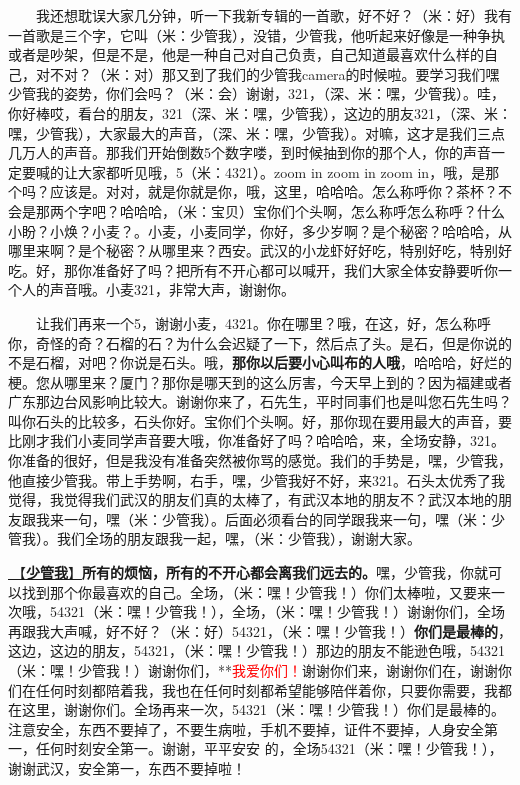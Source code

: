\documentclass[]{ctexbook}
\begin{document}
  我还想耽误大家几分钟，听一下我新专辑的一首歌，好不好？（米：好）我有一首歌是三个字，它叫（米：少管我），没错，少管我，他听起来好像是一种争执或者是吵架，但是不是，他是一种自己对自己负责，自己知道最喜欢什么样的自己，对不对？（米：对）那又到了我们的少管我camera的时候啦。要学习我们嘿少管我的姿势，你们会吗？（米：会）谢谢，321，（深、米：嘿，少管我）。哇，你好棒哎，看台的朋友，321（深、米：嘿，少管我），这边的朋友321，（深、米：嘿，少管我），大家最大的声音，（深、米：嘿，少管我）。对嘛，这才是我们三点几万人的声音。那我们开始倒数5个数字喽，到时候抽到你的那个人，你的声音一定要喊的让大家都听见哦，5（米：4321）。zoom in zoom in zoom in，哦，是那个吗？应该是。对对，就是你就是你，哦，这里，哈哈哈。怎么称呼你？茶杯？不会是那两个字吧？哈哈哈，（米：宝贝）宝你们个头啊，怎么称呼怎么称呼？什么小盼？小焕？小麦？。小麦，小麦同学，你好，多少岁啊？是个秘密？哈哈哈，从哪里来啊？是个秘密？从哪里来？西安。武汉的小龙虾好好吃，特别好吃，特别好吃。好，那你准备好了吗？把所有不开心都可以喊开，我们大家全体安静要听你一个人的声音哦。小麦321，非常大声，谢谢你。

  让我们再来一个5，谢谢小麦，4321。你在哪里？哦，在这，好，怎么称呼你，奇怪的奇？石榴的石？为什么会迟疑了一下，然后点了头。是石，但是你说的不是石榴，对吧？你说是石头。哦，\textbf{那你以后要小心叫布的人哦}，哈哈哈，好烂的梗。您从哪里来？厦门？那你是哪天到的这么厉害，今天早上到的？因为福建或者广东那边台风影响比较大。谢谢你来了，石先生，平时同事们也是叫您石先生吗？叫你石头的比较多，石头你好。宝你们个头啊。好，那你现在要用最大的声音，要比刚才我们小麦同学声音要大哦，你准备好了吗？哈哈哈，来，全场安静，321。你准备的很好，但是我没有准备突然被你骂的感觉。我们的手势是，嘿，少管我，他直接少管我。带上手势啊，右手，嘿，少管我好不好，来321。石头太优秀了我觉得，我觉得我们武汉的朋友们真的太棒了，有武汉本地的朋友不？武汉本地的朋友跟我来一句，嘿（米：少管我）。后面必须看台的同学跟我来一句，嘿（米：少管我）。我们全场的朋友跟我一起，嘿，（米：少管我），谢谢大家。

\hyperref[watch-ur-manners]{🎵【\textbf{少管我}】}\textbf{所有的烦恼，所有的不开心都会离我们远去的。}嘿，少管我，你就可以找到那个你最喜欢的自己。全场，（米：嘿！少管我！）你们太棒啦，又要来一次哦，54321（米：嘿！少管我！），全场，（米：嘿！少管我！）谢谢你们，全场再跟我大声喊，好不好？（米：好）54321，（米：嘿！少管我！）\textbf{你们是最棒的}，这边，这边的朋友，54321，（米：嘿！少管我！）那边的朋友不能逊色哦，54321（米：嘿！少管我！）谢谢你们，**\textcolor{red}{我爱你们！}谢谢你们来，谢谢你们在，谢谢你们在任何时刻都陪着我，我也在任何时刻都希望能够陪伴着你，只要你需要，我都在这里，谢谢你们。全场再来一次，54321（米：嘿！少管我！）你们是最棒的。注意安全，东西不要掉了，不要生病啦，手机不要掉，证件不要掉，人身安全第一，任何时刻安全第一。谢谢，平平安安 的，全场54321（米：嘿！少管我！），谢谢武汉，安全第一，东西不要掉啦！
\end{document}

